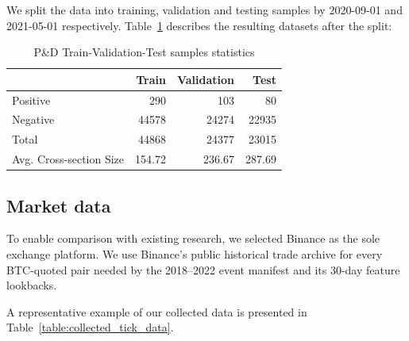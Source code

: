 \documentclass{ieeeaccess}
\begin{document}
We split the data into training, validation and testing samples by 2020-09-01 and 2021-05-01 respectively. Table~\ref{table:train_val_test_stats} describes the resulting datasets after the split: 

\begin{table}[!t]
    \centering
    \setlength{\tabcolsep}{8pt} %
    \renewcommand{\arraystretch}{1.2} %
    
        \begin{tabular}{lrrr}
            \toprule
             & Train & Validation & Test \\
            \midrule
                Positive & 290 & 103 & 80 \\
                Negative & 44578 & 24274 & 22935 \\
                Total & 44868 & 24377 & 23015 \\
                Avg. Cross-section Size & 154.72 & 236.67 & 287.69 \\
            \bottomrule
        \end{tabular}
        \caption{P\&D Train-Validation-Test samples statistics}
     \label{table:train_val_test_stats}
\end{table}

\subsection{Market data}

To enable comparison with existing research, we selected Binance as the sole exchange platform. We use Binance's public historical trade archive for every BTC-quoted pair needed by the 2018--2022 event manifest and its 30-day feature lookbacks.

A representative example of our collected data is presented in Table~\ref{table:collected_tick_data}.
\end{document}
